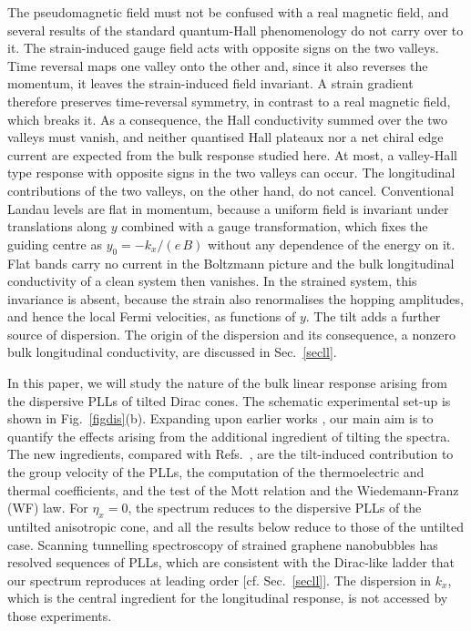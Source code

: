 \documentclass[aps,prb, onecolumn, nofootinbib, citeautoscript,10pt]{revtex4-2}
\begin{document}
The pseudomagnetic field must not be confused with a real magnetic field, and several results of the standard quantum-Hall phenomenology do not carry over to it. The strain-induced gauge field acts with opposite signs on the two valleys. Time reversal maps one valley onto the other and, since it also reverses the momentum, it leaves the strain-induced field invariant. A strain gradient therefore preserves time-reversal symmetry, in contrast to a real magnetic field, which breaks it. As a consequence, the Hall conductivity summed over the two valleys must vanish, and neither quantised Hall plateaux nor a net chiral edge current are expected from the bulk response studied here. At most, a valley-Hall type response with opposite signs in the two valleys can occur. The longitudinal contributions of the two valleys, on the other hand, do not cancel. Conventional Landau levels are flat in momentum, because a uniform field is invariant under translations along $y$ combined with a gauge transformation, which fixes the guiding centre as $y_0=-k_x/(e\,B)$ without any dependence of the energy on it. Flat bands carry no current in the Boltzmann picture and the bulk longitudinal conductivity of a clean system then vanishes. In the strained system, this invariance is absent, because the strain also renormalises the hopping amplitudes, and hence the local Fermi velocities, as functions of $y$. The tilt adds a further source of dispersion. The origin of the dispersion and its consequence, a nonzero bulk longitudinal conductivity, are discussed in Sec.~\ref{secll}.




In this paper, we will study the nature of the bulk linear response arising from the dispersive PLLs of tilted Dirac cones. The schematic experimental set-up is shown in Fig.~\ref{figdis}(b). Expanding upon earlier works \cite{strained-dirac-franz, complex-LL-strained-graphene}, our main aim is to quantify the effects arising from the additional ingredient of tilting the spectra. The new ingredients, compared with Refs.~\cite{strained-dirac-franz, complex-LL-strained-graphene}, are the tilt-induced contribution to the group velocity of the PLLs, the computation of the thermoelectric and thermal coefficients, and the test of the Mott relation and the Wiedemann-Franz (WF) law. For $\eta_x=0$, the spectrum reduces to the dispersive PLLs of the untilted anisotropic cone, and all the results below reduce to those of the untilted case. Scanning tunnelling spectroscopy of strained graphene nanobubbles \cite{levy10} has resolved sequences of PLLs, which are consistent with the Dirac-like ladder that our spectrum reproduces at leading order [cf. Sec.~\ref{secll}]. The dispersion in $k_x$, which is the central ingredient for the longitudinal response, is not accessed by those experiments. 
\end{document}
